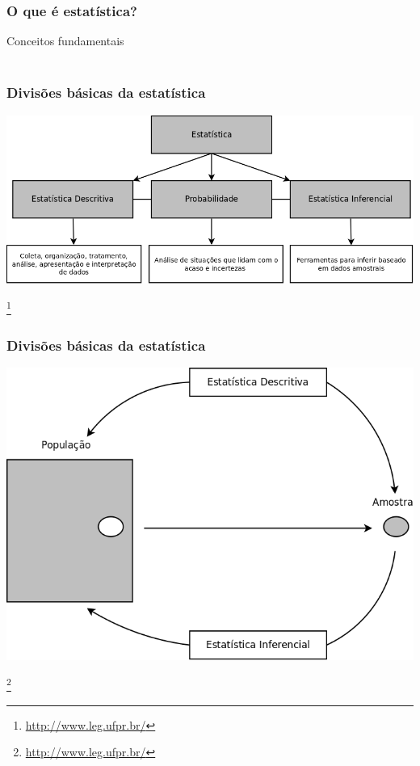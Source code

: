 \documentclass[11pt]{beamer}
\newcommand\blfootnote[1]{%
  \begingroup
  \renewcommand\thefootnote{}\footnote{#1}%
  \addtocounter{footnote}{-1}%
  \endgroup
}
\begin{document}
\begin{frame}
\frametitle{O que é estatística?}
  Conceitos fundamentais
  \\~\\
  \begin{itemize}
  \end{itemize}
\end{frame}

\begin{frame}
\frametitle{Divisões básicas da estatística}

\begin{center}\includegraphics[width=1.0\linewidth]{figs/organograma_estatistica} \end{center}
\blfootnote{\url{http://www.leg.ufpr.br/}}
\end{frame}


\begin{frame}
\frametitle{Divisões básicas da estatística}

\begin{center}\includegraphics[width=0.75\linewidth]{figs/populacao_amostra} \end{center}
\blfootnote{\url{http://www.leg.ufpr.br/}}
\end{frame}
\end{document}
